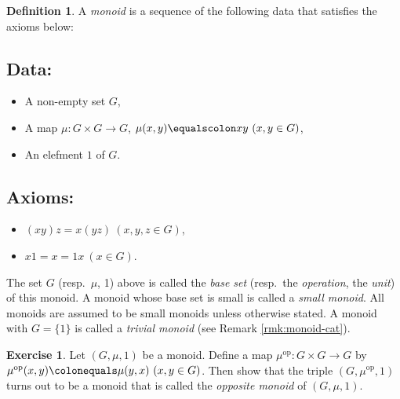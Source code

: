 \documentclass{surv-l}
\numberwithin{equation}{chapter}
\numberwithin{figure}{chapter}
\theoremstyle{plain}
\theoremstyle{definition}
\newtheorem{dfn}[thm]{Definition}
\newtheorem{exc}[thm]{Exercise}
\theoremstyle{remark}
\begin{document}
\begin{dfn}
A \emph{monoid} is a sequence of the following data that satisfies the axioms below:

\subsection*{Data:}
\begin{itemize}
\item
A non-empty set $G$,
\item
A map $\mu\colon G \times G \to G$, $\mu(x,y) \equalscolon xy\ (x,y \in G)$,
\item
An elefment $1$ of $G$.
\end{itemize}

\subsection*{Axioms:}
\begin{itemize}
\item
$(xy)z=x(yz)\ (x, y, z \in G)$,
\item
$x1 = x =1x\ (x \in G)$.
\end{itemize}
The set $G$ (resp.\ $\mu$, 1) above is called the \emph{base set}
(resp.\ the \emph{operation}, the \emph{unit}) of this monoid.
A monoid whose base set is small is called a \emph{small monoid}.
All monoids are assumed to be small monoids unless otherwise stated.
A monoid with $G = \{1\}$ is called a \emph{trivial monoid} (see Remark \ref{rmk:monoid-cat}).
\end{dfn}

\begin{exc}
Let $(G, \mu, 1)$ be a monoid.
Define a map $\mu^{\mathrm{op}}\colon G \times G \to G$ by
$\mu^{\mathrm{op}}(x, y)\colonequals  \mu(y,x) \ (x, y \in G)$.
Then show that the triple
$(G, \mu^{\mathrm{op}}, 1)$ turns out to be a monoid that is called the
\emph{opposite monoid} of $(G, \mu, 1)$.
\end{exc}
\end{document}
